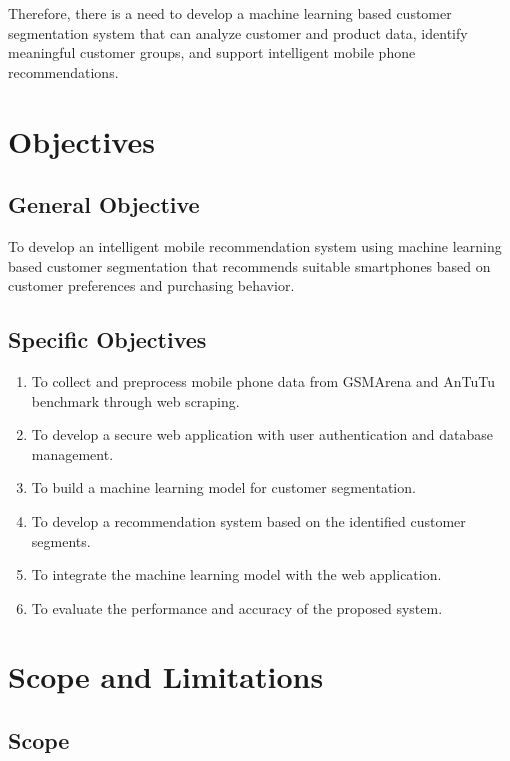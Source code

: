\documentclass[12pt, a4paper]{report}
\numberwithin{equation}{chapter}
\begin{document}
Therefore, there is a need to develop a machine learning based customer segmentation system that can analyze customer and product data, identify meaningful customer groups, and support intelligent mobile phone recommendations.

\section{Objectives}

\subsection{General Objective}

To develop an intelligent mobile recommendation system using machine learning based customer segmentation that recommends suitable smartphones based on customer preferences and purchasing behavior.

\subsection{Specific Objectives}

\begin{enumerate}[label=\Roman*.]
    \item To collect and preprocess mobile phone data from GSMArena and AnTuTu benchmark through web scraping.
    
    \item To develop a secure web application with user authentication and database management.
    
    \item To build a machine learning model for customer segmentation.
    
    \item To develop a recommendation system based on the identified customer segments.
    
    \item To integrate the machine learning model with the web application.
    
    \item To evaluate the performance and accuracy of the proposed system.
\end{enumerate}

\section{Scope and Limitations}

\subsection{Scope}
\end{document}

